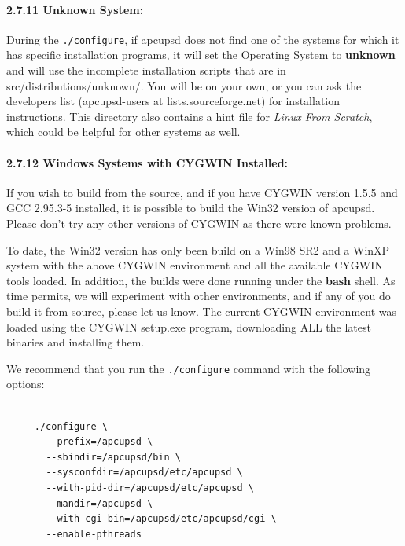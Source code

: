 \paragraph*{2.7.11 Unknown System:}

\label{index-Unknown-System-53}
\label{index-OS_002c-Unknown-System-54}
During the {\tt ./configure}, if apcupsd does not find one of the systems for
which it has specific installation programs, it will set the Operating System
to {\bf unknown} and will use the incomplete installation scripts that are in
\lt{}src\gt{}/distributions/unknown/. You will be on your own, or you can ask
the developers list (apcupsd-users at lists.sourceforge.net) for installation
instructions. This directory also contains a hint file for {\it Linux From
Scratch}, which could be helpful for other systems as well. 

\label{Windows-Systems-with-CYGWIN-Installed}

\paragraph*{2.7.12 Windows Systems with CYGWIN Installed:}

\label{index-Windows-55}
\label{index-OS_002c-Windows-56}
If you wish to build from the source, and if you have CYGWIN version 1.5.5 and
GCC 2.95.3-5 installed, it is possible to build the Win32 version of apcupsd.
Please don't try any other versions of CYGWIN as there were known problems.  

To date, the Win32 version has only been build on a Win98 SR2 and a WinXP
system with the above CYGWIN environment and all the available CYGWIN tools
loaded. In addition, the builds were done running under the {\bf bash} shell.
As time permits, we will experiment with other environments, and if any of you
do build it from source, please let us know. The current CYGWIN environment
was loaded using the CYGWIN setup.exe program, downloading ALL the latest
binaries and installing them.  

We recommend that you run the {\tt ./configure} command with the following
options: 

\footnotesize
\begin{verbatim}
     
     ./configure \
       --prefix=/apcupsd \
       --sbindir=/apcupsd/bin \
       --sysconfdir=/apcupsd/etc/apcupsd \
       --with-pid-dir=/apcupsd/etc/apcupsd \
       --mandir=/apcupsd \
       --with-cgi-bin=/apcupsd/etc/apcupsd/cgi \
       --enable-pthreads
\end{verbatim}
\normalsize

